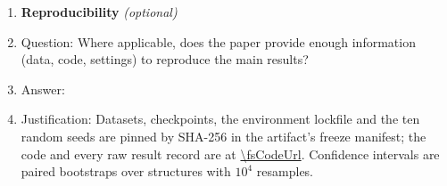 \begin{enumerate}
\item {\bf Reproducibility} \emph{(optional)}
    \item[] Question: Where applicable, does the paper provide enough information (data, code, settings) to reproduce the main results?
    \item[] Answer: \answerYes{}
    \item[] Justification: Datasets, checkpoints, the environment lockfile and the ten random seeds are pinned by SHA-256 in the artifact's freeze manifest; the code and every raw result record are at \url{\fsCodeUrl}. Confidence intervals are paired bootstraps over structures with $10^4$ resamples.

\end{enumerate}
